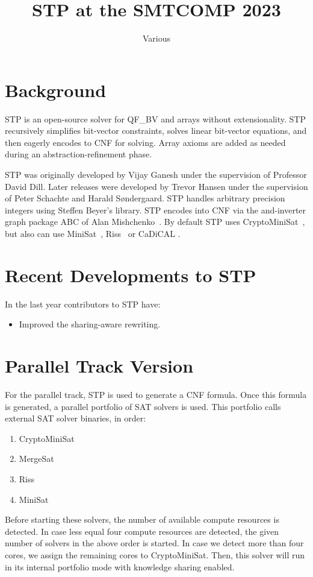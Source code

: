 \documentclass{easychair}
\begin{document}
\title{STP at the SMTCOMP 2023}
\author{Various}
\institute{}

\maketitle
\thispagestyle{empty}
\pagestyle{empty}

\section{Background}
STP\cite{Vijay:Thesis:2007, Trevor:Thesis:2012} is an open-source solver for QF\_BV and arrays without extensionality. 
STP recursively simplifies bit-vector constraints, solves linear bit-vector equations, and then eagerly encodes to CNF for solving. 
Array axioms are added as needed during an abstraction-refinement phase.

STP was originally developed by Vijay Ganesh under the supervision of Professor David Dill. 
Later releases were developed by Trevor Hansen under the supervision of Peter Schachte and Harald Søndergaard. 
STP handles arbitrary precision integers using Steffen Beyer's library. 
STP encodes into CNF via the and-inverter graph package ABC of Alan Mishchenko~\cite{Brayton:2010:AAI:2144310.2144317}.
By default STP uses CryptoMiniSat~\cite{CMS:github}, but also can use MiniSat~\cite{MiniSat:github}, Riss~\cite{Riss:github} or CaDiCAL \cite{cadical}.

\section{Recent Developments to STP}
In the last year contributors to STP have:
\begin{itemize}
\item{Improved the sharing-aware rewriting.}
\end{itemize}

\iffalse
	\section{Parallel Track Version}

	For the parallel track, STP is used to generate a CNF formula.
	Once this formula is generated, a parallel portfolio of SAT solvers is used.
	This portfolio calls external SAT solver binaries, in order:
	\begin{enumerate}
	 \item CryptoMiniSat~\cite{CMS:github}
	 \item MergeSat~\cite{MergeSAT:github}
	 \item Riss~\cite{Riss:github}
	 \item MiniSat~\cite{MiniSat:github}
	\end{enumerate}
	Before starting these solvers, the number of available compute resources is detected.
	In case less equal four compute resources are detected, the given number of solvers in the above order is started.
	In case we detect more than four cores, we assign the remaining cores to CryptoMiniSat.
	Then, this solver will run in its internal portfolio mode with knowledge sharing enabled.
\end{document}

